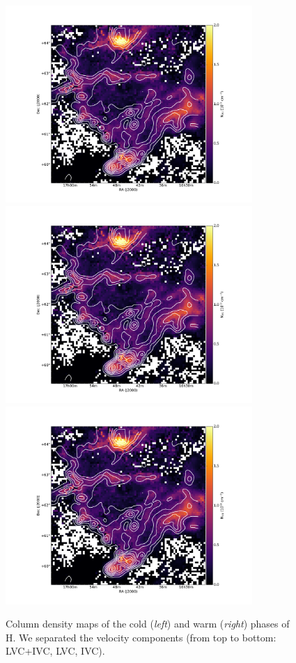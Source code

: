 \documentclass[traditabstract]{aa}
\begin{document}
\begin{figure}[h]
  \hspace{3mm}
  \includegraphics[page=5,height=7.5cm,trim=45 5 65 35,clip=true]{Figures/GHIGLS_NHI.pdf} \\
  \vspace{3mm}
  \includegraphics[page=3,height=7.5cm,trim=45 5 65 35,clip=true]{Figures/GHIGLS_NHI.pdf}
  \hspace{3mm}
  \includegraphics[page=6,height=7.5cm,trim=45 5 65 35,clip=true]{Figures/GHIGLS_NHI.pdf}
  \caption{Column density maps of the cold (\emph{left}) and warm (\emph{right}) phases of H. We separated the velocity components (from top to bottom: LVC+IVC, LVC, IVC).}
\end{figure}
\end{document}
